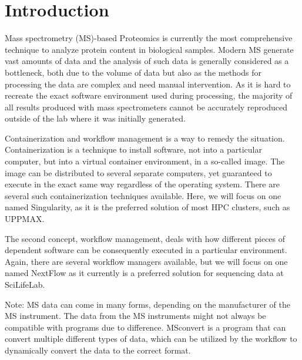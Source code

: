 \section{Introduction}

Mass spectrometry (MS)-based Proteomics is currently the most comprehensive technique to analyze protein content in biological samples. Modern MS generate vast amounts of data and the analysis of such data is generally considered as a bottleneck, both due to the volume of data but also as the methods for processing the data are complex and need manual intervention. As it is hard to recreate the exact software environment used during processing, the majority of all results produced with mass spectrometers cannot be accurately reproduced outside of the lab where it was initially generated.

Containerization and workflow management is a way to remedy the situation. Containerization is a technique to install software, not into a particular computer, but into a virtual container environment, in a so-called image. The image can be distributed to several separate computers, yet guaranteed to execute in the exact same way regardless of the operating system. There are several such containerization techniques available. Here, we will focus on one named Singularity, as it is the preferred solution of most HPC clusters, such as UPPMAX.

The second concept, workflow management, deals with how different pieces of dependent software can be consequently executed in a particular environment. Again, there are several workflow managers available, but we will focus on one named NextFlow as it currently is a preferred solution for sequencing data at SciLifeLab.

 Note: MS data can come in many forms, depending on the manufacturer of the MS instrument. The data from the MS instruments might not always be compatible with programs due to difference. MSconvert is a program that can convert multiple different types of data, which can be utilized by the workflow to dynamically convert the data to the correct format.
